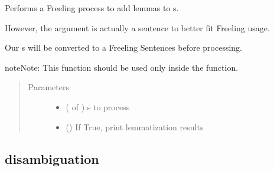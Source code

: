 \documentclass[letterpaper,10pt,english]{sphinxmanual}
\begin{document}
\begin{fulllineitems}
\label{\detokenize{process:loacore.process.lemma_process.add_lemmas_to_sentences}}
Performs a Freeling process to add lemmas to  s.

However, the argument is actually a sentence to better fit Freeling usage.

Our  s will be converted to a Freeling Sentences before processing.

\begin{sphinxadmonition}{note}{Note:}
This function should be used only inside the  function.
\end{sphinxadmonition}
\begin{quote}\begin{description}
\item[{Parameters}] \leavevmode\begin{itemize}
\item {} 
 ( of ) \textendash{}  s to process

\item {} 
 () \textendash{} If True, print lemmatization results

\end{itemize}

\end{description}\end{quote}

\end{fulllineitems}



\subsection{disambiguation}
\label{\detokenize{process:module-loacore.process.synset_process}}\label{\detokenize{process:disambiguation}}
\end{document}
